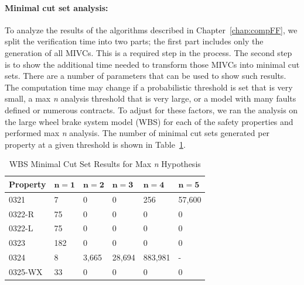 \paragraph{Minimal cut set analysis:} To analyze the results of the algorithms described in Chapter~\ref{chap:compFF}, we split the verification time into two parts; the first part includes only the generation of all MIVCs. This is a required step in the process. The second step is to show the additional time needed to transform those MIVCs into minimal cut sets. There are a number of parameters that can be used to show such results. The computation time may change if a probabilistic threshold is set that is very small, a max \textit{n} analysis threshold that is very large, or a model with many faults defined or numerous contracts. To adjust for these factors, we ran the analysis on the large wheel brake system model (WBS) for each of the safety properties and performed max \textit{n} analysis. The number of minimal cut sets generated per property at a given threshold is shown in Table~\ref{tab:wbs_maxN_results}.
\begin{table}[htbp]
\begin{center}
    \begin{tabular}{ | l | l | l | l | l | l |}
    \hline
    \textbf{Property} & $\bm{n = 1}$ & $\bm{n = 2}$ & $\bm{n = 3}$ & $\bm{n = 4}$ 
		& $\bm{n = 5}$    \\ \hline \hline
    0321 & 7 & 0 & 0 & 256 & 57,600   \\ \hline
    0322-R & 75 & 0 & 0 & 0 & 0  \\ \hline
    0322-L & 75 & 0 & 0 & 0 & 0  \\ \hline
    0323 & 182 & 0 & 0 & 0 & 0  \\ \hline
    0324 & 8 & 3,665 & 28,694 & 883,981 & - \\ \hline
    0325-WX & 33 & 0 & 0 &0 &0 \\ \hline
    \end{tabular}
    \caption{WBS Minimal Cut Set Results for Max \textit{n} Hypothesis}
    \label{tab:wbs_maxN_results}
    \end{center}
\end{table}

